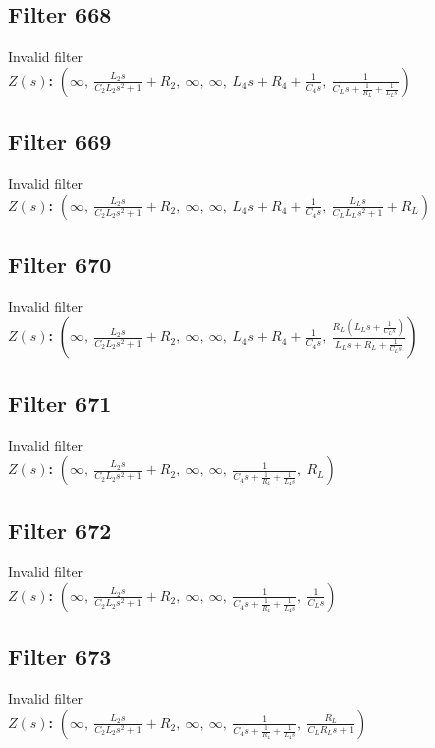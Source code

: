 \documentclass{article}
\begin{document}
\subsection*{Filter 668}
Invalid filter \\ 
\textbf{$Z(s)$:} $\left( \infty, \  \frac{L_{2} s}{C_{2} L_{2} s^{2} + 1} + R_{2}, \  \infty, \  \infty, \  L_{4} s + R_{4} + \frac{1}{C_{4} s}, \  \frac{1}{C_{L} s + \frac{1}{R_{L}} + \frac{1}{L_{L} s}}\right)$ \\ 
\subsection*{Filter 669}
Invalid filter \\ 
\textbf{$Z(s)$:} $\left( \infty, \  \frac{L_{2} s}{C_{2} L_{2} s^{2} + 1} + R_{2}, \  \infty, \  \infty, \  L_{4} s + R_{4} + \frac{1}{C_{4} s}, \  \frac{L_{L} s}{C_{L} L_{L} s^{2} + 1} + R_{L}\right)$ \\ 
\subsection*{Filter 670}
Invalid filter \\ 
\textbf{$Z(s)$:} $\left( \infty, \  \frac{L_{2} s}{C_{2} L_{2} s^{2} + 1} + R_{2}, \  \infty, \  \infty, \  L_{4} s + R_{4} + \frac{1}{C_{4} s}, \  \frac{R_{L} \left(L_{L} s + \frac{1}{C_{L} s}\right)}{L_{L} s + R_{L} + \frac{1}{C_{L} s}}\right)$ \\ 
\subsection*{Filter 671}
Invalid filter \\ 
\textbf{$Z(s)$:} $\left( \infty, \  \frac{L_{2} s}{C_{2} L_{2} s^{2} + 1} + R_{2}, \  \infty, \  \infty, \  \frac{1}{C_{4} s + \frac{1}{R_{4}} + \frac{1}{L_{4} s}}, \  R_{L}\right)$ \\ 
\subsection*{Filter 672}
Invalid filter \\ 
\textbf{$Z(s)$:} $\left( \infty, \  \frac{L_{2} s}{C_{2} L_{2} s^{2} + 1} + R_{2}, \  \infty, \  \infty, \  \frac{1}{C_{4} s + \frac{1}{R_{4}} + \frac{1}{L_{4} s}}, \  \frac{1}{C_{L} s}\right)$ \\ 
\subsection*{Filter 673}
Invalid filter \\ 
\textbf{$Z(s)$:} $\left( \infty, \  \frac{L_{2} s}{C_{2} L_{2} s^{2} + 1} + R_{2}, \  \infty, \  \infty, \  \frac{1}{C_{4} s + \frac{1}{R_{4}} + \frac{1}{L_{4} s}}, \  \frac{R_{L}}{C_{L} R_{L} s + 1}\right)$ \\ 
\end{document}
